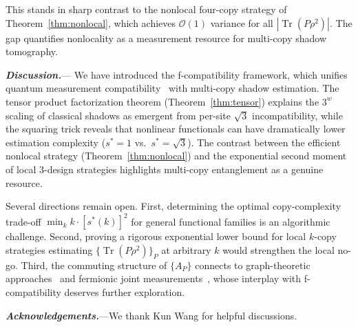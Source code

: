 \documentclass[aps,%
twocolumn,%
floatfix,%
pra,%
amsfonts,%
groupedaddress,%
superscriptaddress]{revtex4-2}%
\DeclareMathOperator{\tr}{Tr}
\newcommand{\1}{\mathbbm{1}}
\newcommand\prlsection[1]{\textit{\textbf{#1}}---}
\begin{document}
This stands in sharp contrast to the nonlocal four-copy strategy of Theorem~\ref{thm:nonlocal}, which achieves $\mathcal{O}(1)$ variance for all $|\tr(P\rho^2)|$. The gap quantifies nonlocality as a measurement resource for multi-copy shadow tomography.

\prlsection{Discussion.}\label{sec:discussion}
We have introduced the f-compatibility framework, which unifies quantum measurement compatibility~\cite{heinosaari2015noise,designolle2019incompatibility} with multi-copy shadow estimation. The tensor product factorization theorem (Theorem~\ref{thm:tensor}) explains the $3^w$ scaling of classical shadows as emergent from per-site $\sqrt{3}$ incompatibility, while the squaring trick reveals that nonlinear functionals can have dramatically lower estimation complexity ($s^*=1$ vs.\ $s^*=\sqrt{3}$). The contrast between the efficient nonlocal strategy (Theorem~\ref{thm:nonlocal}) and the exponential second moment of local 3-design strategies highlights multi-copy entanglement as a genuine resource.


Several directions remain open. First, determining the optimal copy-complexity trade-off $\min_k k\cdot[s^*(k)]^2$ for general functional families is an algorithmic challenge. Second, proving a rigorous exponential lower bound for local $k$-copy strategies estimating $\{\tr(P\rho^2)\}_P$ at arbitrary $k$ would strengthen the local no-go. Third, the commuting structure of $\{A_P\}$ connects to graph-theoretic approaches~\cite{graph2024nonlinear} and fermionic joint measurements~\cite{mcnulty2024fermionic}, whose interplay with f-compatibility deserves further exploration.

\prlsection{Acknowledgements.}We thank Kun Wang for helpful discussions.


% 



\makeatletter
\newcommand{\appendixtitle}[1]{\gdef\@title{#1}}
\newcommand{\appendixauthor}[1]{\gdef\@author{#1}}
\newcommand{\appendixaffiliation}[1]{\gdef\@affiliation{#1}}
\newcommand{\appendixdate}[1]{\gdef\@date{#1}}
\makeatother
\end{document}
